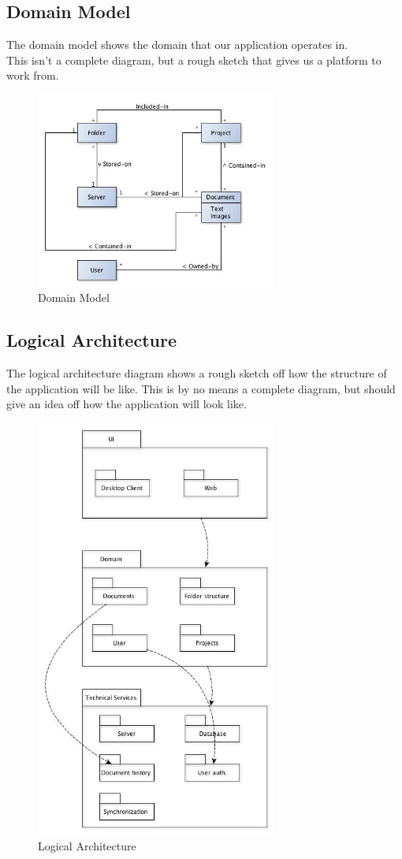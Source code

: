 \documentclass[11pt]{article}
\begin{document}
\subsection{Domain Model}
\label{sec-2-3}
The domain model shows the domain that our application operates in. \\
This isn't a complete diagram, but a rough sketch that gives us a platform to work from.
\begin{figure}[H]
  		\centering
    	\includegraphics[width=300px]{images/DomainModel.jpg}
    	\caption{Domain Model}
\end{figure}
\subsection{Logical Architecture}
\label{sec-2-4}

   The logical architecture diagram shows a rough sketch off how the structure of the application
   will be like. This is by no means a complete diagram, but should give an idea off how
   the application will look like.
\begin{figure}[H]
  		\centering
    	\includegraphics[width=300px]{images/LogicalArchitecture.jpg}
    	\caption{Logical Architecture}
\end{figure}
\end{document}
